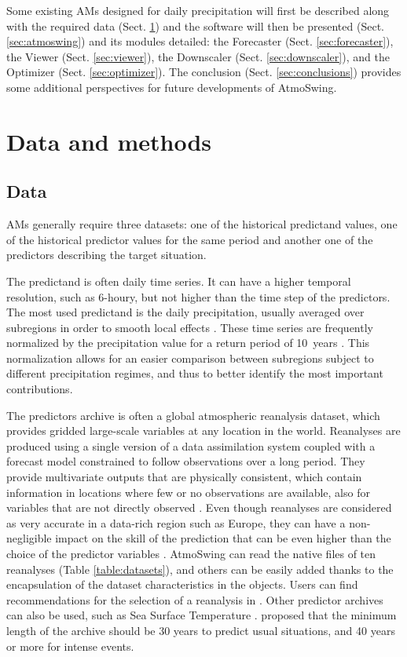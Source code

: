 \documentclass[review]{elsarticle}
\begin{document}
Some existing AMs designed for daily precipitation will first be described along with the required data (Sect. \ref{sec:data_methods}) and the software will then be presented (Sect. \ref{sec:atmoswing}) and its modules detailed: the Forecaster (Sect. \ref{sec:forecaster}), the Viewer (Sect. \ref{sec:viewer}), the Downscaler (Sect. \ref{sec:downscaler}), and the Optimizer (Sect. \ref{sec:optimizer}). The conclusion (Sect. \ref{sec:conclusions}) provides some additional perspectives for future developments of AtmoSwing. 


\section{Data and methods}
\label{sec:data_methods}


\subsection{Data}
\label{sec:data}

AMs generally require three datasets: one of the historical predictand values, one of the historical predictor values for the same period and another one of the predictors describing the target situation.

The predictand is often daily time series. It can have a higher temporal resolution, such as 6-houry, but not higher than the time step of the predictors. The most used predictand is the daily precipitation, usually averaged over subregions in order to smooth local effects \citep{Obled2002, Marty2012}. These time series are frequently normalized by the precipitation value for a return period of 10~years \citep{Djerboua2001}. This normalization allows for an easier comparison between subregions subject to different precipitation regimes, and thus to better identify the most important contributions.

The predictors archive is often a global atmospheric reanalysis dataset, which provides gridded large-scale variables at any location in the world. Reanalyses are produced using a single version of a data assimilation system coupled with a forecast model constrained to follow observations over a long period. They provide multivariate outputs that are physically consistent, which contain information in locations where few or no observations are available, also for variables that are not directly observed \citep{Gelaro2017}. Even though reanalyses are considered as very accurate in a data-rich region such as Europe, they can have a non-negligible impact on the skill of the prediction that can be even higher than the choice of the predictor variables \cite{Dayon2015, Horton2018b}. AtmoSwing can read the native files of ten reanalyses (Table \ref{table:datasets}), and others can be easily added thanks to the encapsulation of the dataset characteristics in the objects. Users can find recommendations for the selection of a reanalysis in \cite{Horton2018b}. Other predictor archives can also be used, such as Sea Surface Temperature \citep[SST, ][]{Reynolds2007}. \citet{Bontron2004} proposed that the minimum length of the archive should be 30 years to predict usual situations, and 40 years or more for intense events.
\end{document}
